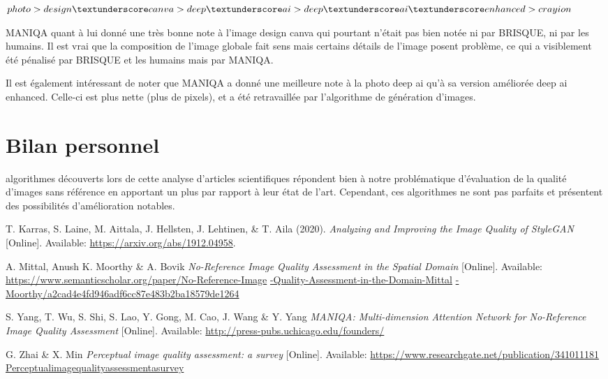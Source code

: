 \documentclass{ieeeaccess}
\begin{document}
$photo > design\textunderscore canva > deep\textunderscore ai > deep\textunderscore ai\textunderscore enhanced > crayion$ 

MANIQA quant à lui donné une très bonne note à l’image design canva qui pourtant n’était pas bien notée ni par BRISQUE, ni par les humains. Il est vrai que la composition de l’image globale fait sens mais certains détails de l’image posent problème, ce qui a visiblement été pénalisé par BRISQUE et les humains mais par MANIQA. 

Il est également intéressant de noter que MANIQA a donné une meilleure note à la photo deep ai qu’à sa version améliorée deep ai enhanced. Celle-ci est plus nette (plus de pixels), et a été retravaillée par l’algorithme de génération d’images.

\section{Bilan personnel}

 algorithmes découverts lors de cette analyse d’articles scientifiques répondent bien à notre problématique d’évaluation de la qualité d’images sans référence en apportant un plus par rapport à leur état de l’art. Cependant, ces algorithmes ne sont pas parfaits et présentent des possibilités d’amélioration notables.  

\begin{thebibliography}{00}

T. Karras, S. Laine, M. Aittala, J. Hellsten, J. Lehtinen, \& T. Aila (2020).
\emph{Analyzing and Improving the Image Quality of StyleGAN} [Online].
\newline
Available:
\underline{https://arxiv.org/abs/1912.04958}.

A. Mittal, Anush K. Moorthy \& A. Bovik
\emph{No-Reference Image Quality Assessment in the Spatial Domain} [Online].
\newline
Available:
\underline{https://www.semanticscholar.org/paper/No-Reference-Image}
\underline{-Quality-Assessment-in-the-Domain-Mittal}
\underline{-Moorthy/a2cad4e4fd946adf6cc87e483b2ba18579de1264}

S. Yang, T. Wu, S. Shi, S. Lao, Y. Gong, M. Cao, J. Wang \& Y. Yang
\emph{MANIQA: Multi-dimension Attention Network for No-Reference Image Quality Assessment} [Online].
\newline
Available:
\underline{http://press-pubs.uchicago.edu/founders/}

G. Zhai \& X. Min
\emph{Perceptual image quality assessment: a survey} [Online].
\newline
Available:
\underline{https://www.researchgate.net/publication/341011181}
\underline{\textunderscore Perceptual\textunderscore image\textunderscore quality\textunderscore assessment\textunderscore a\textunderscore survey}

\end{thebibliography}

\EOD
\end{document}
